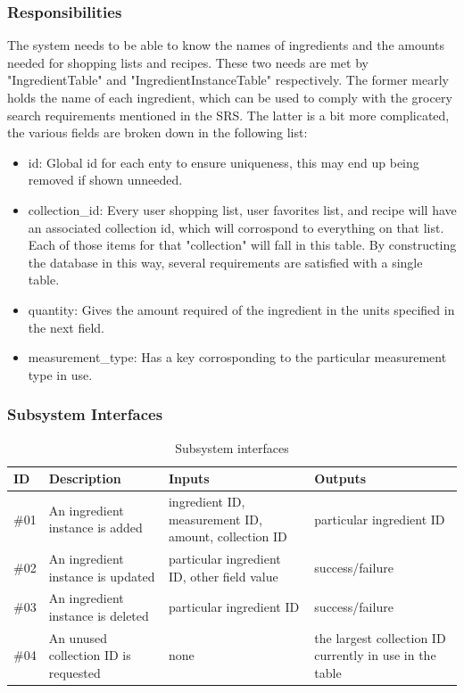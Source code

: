 \subsubsection{Responsibilities}
The system needs to be able to know the names of ingredients and the amounts needed for shopping lists and recipes.  These two needs are met by "IngredientTable" and "IngredientInstanceTable" respectively.  The former mearly holds the name of each ingredient, which can be used to comply with the grocery search requirements mentioned in the SRS.  The latter is a bit more complicated, the various fields are broken down in the following list:
\begin{itemize}
    \item id: Global id for each enty to ensure uniqueness, this may end up being removed if shown unneeded.
    \item collection\_id: Every user shopping list, user favorites list, and recipe will have an associated collection id, which will corrospond to everything on that list.  Each of those items for that "collection" will fall in this table.  By constructing the database in this way, several requirements are satisfied with a single table.
    \item quantity: Gives the amount required of the ingredient in the units specified in the next field.
    \item measurement\_type: Has a key corrosponding to the particular measurement type in use.
\end{itemize}


\subsubsection{Subsystem Interfaces}
\begin {table}[H]
\caption {Subsystem interfaces} 
\begin{center}
    \begin{tabular}{ | p{1cm} | p{6cm} | p{3cm} | p{3cm} |}
    \hline
    ID & Description & Inputs & Outputs \\ \hline
    \#01 & An ingredient instance is added & ingredient ID, measurement ID, amount, collection ID & particular ingredient ID  \\ \hline
    \#02 & An ingredient instance is updated & particular ingredient ID, other field value & success/failure  \\ \hline
    \#03 & An ingredient instance is deleted & particular ingredient ID & success/failure  \\ \hline
    \#04 & An unused collection ID is requested & none & the largest collection ID currently in use in the table  \\ \hline
    \end{tabular}
\end{center}
\end{table}

